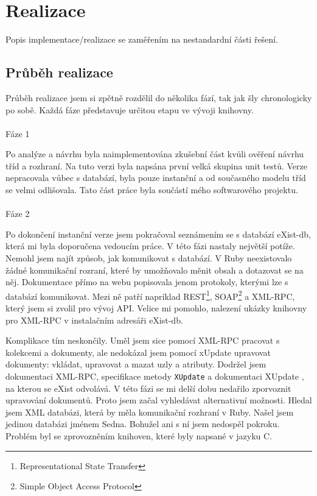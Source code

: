\chapter{Realizace}
Popis implementace/realizace se zaměřením na nestandardní části řešení.

\section{Průběh realizace}
Průběh realizace jsem si zpětně rozdělil do několika fází, tak jak šly chronologicky po sobě. Každá fáze představuje určitou etapu ve vývoji knihovny.
\\
\\
\noindent Fáze 1

\noindent Po analýze a návrhu byla naimplementována zkušební část kvůli ověření návrhu tříd a rozhraní. Na tuto verzi byla napsána první velká skupina unit testů. Verze nepracovala vůbec s databází, byla pouze instanční a od současného modelu tříd se velmi odlišovala. Tato část práce byla součástí mého softwarového projektu.
\\
\\
\noindent Fáze 2

\noindent Po dokončení instanční verze jsem pokračoval seznámením se s databází eXist-db, která mi byla doporučena vedoucím práce. V této fázi nastaly největší potíže. Nemohl jsem najít způsob, jak komunikovat s databází. V Ruby neexistovalo žádné komunikační rozraní, které by umožňovalo měnit obsah a dotazovat se na něj. Dokumentace přímo na webu \cite{exist:exist} popisovala jenom protokoly, kterými lze s databází komunikovat. Mezi ně patří napríklad REST\footnote{Representational State Transfer}, SOAP\footnote{Simple Object Access Protocol} a XML-RPC, který jsem si zvolil pro vývoj API. Velice mi pomohlo, nalezení ukázky knihovny pro XML-RPC v instalačním adresáři eXist-db. 

Komplikace tím neskončily. Uměl jsem sice pomocí XML-RPC pracovat s kolekcemi a dokumenty, ale nedokázal jsem pomocí xUpdate upravovat dokumenty: vkládat, upravovat a mazat uzly a atributy. Dodržel jsem dokumentaci XML-RPC, specifikace metody \verb|XUpdate| \cite{exist:xmlrpcxupdate} a dokumentaci XUpdate \cite{xupdate}, na kterou se eXist odvolává. V této fázi se mi delší dobu nedařilo zporvoznit upravování dokumentů. Proto jsem začal vyhledávat alternativní možnosti. Hledal jsem XML databázi, která by měla komunikační rozhraní v Ruby. Našel jsem jedinou databázi jménem Sedna. Bohužel ani s ní jsem nedospěl pokroku. Problém byl se zprovozněním knihoven, které byly napsané v jazyku C.

